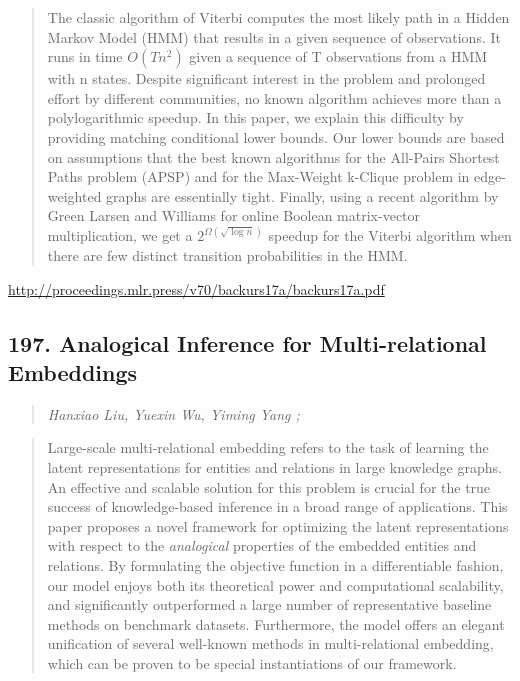 \documentclass{article}
\begin{document}
\begin{quote}
    The classic algorithm of Viterbi computes the most likely path in a Hidden Markov Model (HMM) that results in a given sequence of observations. It runs in time $O(Tn^2)$ given a sequence of T observations from a HMM with n states. Despite significant interest in the problem and prolonged effort by different communities, no known algorithm achieves more than a polylogarithmic speedup. In this paper, we explain this difficulty by providing matching conditional lower bounds. Our lower bounds are based on assumptions that the best known algorithms for the All-Pairs Shortest Paths problem (APSP) and for the Max-Weight k-Clique problem in edge-weighted graphs are essentially tight. Finally, using a recent algorithm by Green Larsen and Williams for online Boolean matrix-vector multiplication, we get a $2^{\Omega(\sqrt{\log n})}$ speedup for the Viterbi algorithm when there are few distinct transition probabilities in the HMM.  \end{quote}

\href{http://proceedings.mlr.press/v70/backurs17a/backurs17a.pdf}{http://proceedings.mlr.press/v70/backurs17a/backurs17a.pdf}

\subsection{197. Analogical Inference for Multi-relational Embeddings}

\begin{quote}
\footnotesize{\textit{Hanxiao Liu, Yuexin Wu, Yiming Yang ;}}
\end{quote}

\begin{quote}
    Large-scale multi-relational embedding refers to the task of learning the latent representations for entities and relations in large knowledge graphs. An effective and scalable solution for this problem is crucial for the true success of knowledge-based inference in a broad range of applications. This paper proposes a novel framework for optimizing the latent representations with respect to the \textit{analogical} properties of the embedded entities and relations. By formulating the objective function in a differentiable fashion, our model enjoys both its theoretical power and computational scalability, and significantly outperformed a large number of representative baseline methods on benchmark datasets. Furthermore, the model offers an elegant unification of several well-known methods in multi-relational embedding, which can be proven to be special instantiations of our framework.  \end{quote}
\end{document}
